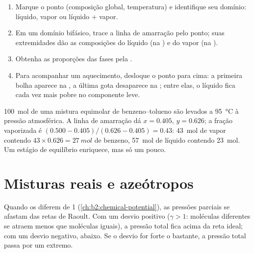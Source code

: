 \begin{method}\label{met:b2:liquid-vapour-diagrams:read-diagram}
\begin{enumerate}
  \item Marque o ponto (composição global, temperatura) e identifique seu
        domínio: líquido, vapor ou líquido + vapor.
  \item Em um domínio bifásico, trace a linha de amarração pelo ponto; suas
        extremidades dão as composições do líquido (na ) e do
        vapor (na ).
  \item Obtenha as proporções das fases pela .
  \item Para acompanhar um aquecimento, desloque o ponto para cima: a primeira
        bolha aparece na , a última gota desaparece na ; entre elas, o líquido fica cada vez mais pobre no componente leve.
\end{enumerate}
\end{method}

\begin{example}\label{ex:b2:liquid-vapour-diagrams:flash}
\qty{100}{mol} de uma mistura equimolar de benzeno--tolueno são levados a
\qty{95}{\degreeCelsius} à pressão atmosférica. A linha de amarração dá $x =
0.405$, $y = 0.626$; a fração vaporizada é $(0.500 - 0.405)/(0.626 - 0.405) =
0.43$: \qty{43}{mol} de vapor contendo $43 \times 0.626 = \qty{27}{mol}$ de
benzeno, \qty{57}{mol} de líquido contendo \qty{23}{mol}. Um estágio de
equilíbrio enriquece, mas só um pouco.
\end{example}

\section{Misturas reais e azeótropos}

Quando os  diferem de 1 (\cref{ch:b2:chemical-potential}),
as pressões parciais se afastam das retas de Raoult. Com um desvio positivo
($\gamma > 1$: moléculas diferentes se atraem menos que moléculas iguais), a
pressão total fica acima da reta ideal; com um desvio negativo, abaixo. Se o
desvio for forte o bastante, a pressão total passa por um extremo.

